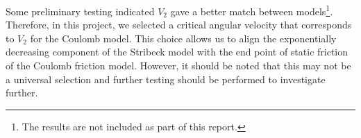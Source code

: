 Some preliminary testing indicated $V_2$ gave a better match between models\footnote{The results are not included as part of this report.}.  Therefore, in this project, we selected a critical angular velocity that corresponds to $V_2$ for the Coulomb model. This choice allows us to align the exponentially decreasing component of the Stribeck model with the end point of static friction of the Coulomb friction model.  However, it should be noted that this may not be a universal selection and further testing should be performed to investigate further.

